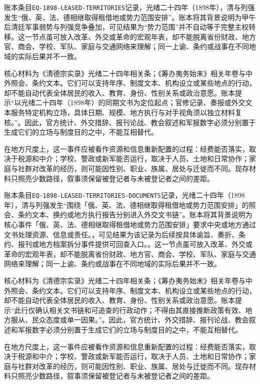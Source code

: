 账本条目\texttt{EQ-1898-LEASED-TERRITORIES}记录，光绪二十四年（1898年），清与列强发生“俄、英、法、德相继取得租借地或势力范围安排”。账本将其背景说明为甲午后清廷军事弱势与列强竞争叠加，可见结果为“势力范围”并不自动等于完整主权转移。这一节点虽可放入改革、外交或革命的宏观年表，却不能脱离省份财政、地方官、商会、学校、军队、家庭与交通网络来理解；同一上谕、条约或战事在不同地域的实际后果并不一致。

核心材料为《清德宗实录》光绪二十四年相关条；《筹办夷务始末》相关年卷与中外照会、条约文本。它们可以支持年序、制度文本、机构设立或某些地点的行动，却不能自动代表全体居民的收入、教育、身份、性别关系或政治意愿。账本提示“以光绪二十四年（1898年）的同期文书为定位起点；官修记录、奏报或外交文本服务特定机构立场，具体日期、规模、地方执行与对手视角须以独立材料复核。”。因此，官方统计、外交措辞、报刊论战、教会叙述和军报数字必须分别置于生成它们的立场与制度目的之中，不能互相替代。

在地方尺度上，这一事件应被看作资源和信息重新配置的过程：经费能否落实，取决于税源和中介；学校、警政或新军能否运行，取决于人员、土地和日常协作；家庭与社群对改革的经历，则可能因性别、职业、族属、居处与迁徙而不同。现存材料只照亮少数路径，叙事须保留被登记者与未被登记者之间的差距。

账本条目\texttt{EQ-1898-LEASED-TERRITORIES-DOCUMENTS}记录，光绪二十四年（1898年），清与列强发生“围绕「俄、英、法、德相继取得租借地或势力范围安排」的照会、条约文本、换约或地方执行报告分别进入外交文书链”。账本将其背景说明为核心事件「俄、英、法、德相继取得租借地或势力范围安排」要求中央或地方通过文书处理资源、信息或责任。，可见结果为该记录为后续按具体谕旨、奏折、条约、报刊或地方档案拆分事件提供可回查入口。。这一节点虽可放入改革、外交或革命的宏观年表，却不能脱离省份财政、地方官、商会、学校、军队、家庭与交通网络来理解；同一上谕、条约或战事在不同地域的实际后果并不一致。

核心材料为《清德宗实录》光绪二十四年相关条；《筹办夷务始末》相关年卷与中外照会、条约文本。它们可以支持年序、制度文本、机构设立或某些地点的行动，却不能自动代表全体居民的收入、教育、身份、性别关系或政治意愿。账本提示“此行仅确认相关文书链和可追查的行政动作；不得由其直接推断政策有效、地方服从、民众态度或单一因果。”。因此，官方统计、外交措辞、报刊论战、教会叙述和军报数字必须分别置于生成它们的立场与制度目的之中，不能互相替代。

在地方尺度上，这一事件应被看作资源和信息重新配置的过程：经费能否落实，取决于税源和中介；学校、警政或新军能否运行，取决于人员、土地和日常协作；家庭与社群对改革的经历，则可能因性别、职业、族属、居处与迁徙而不同。现存材料只照亮少数路径，叙事须保留被登记者与未被登记者之间的差距。

